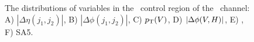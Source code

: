 \begin{figure}[htbp]
{    
  }
  \caption[Additional \qrkt\qrktbar\ Control Region Distributions for the \ZnnH\ Channel]{The distributions of variables in the \qrkt\qrktbar\ control region of the \ZnnH\ channel: A) $\left| \Delta \eta (j_{1}, j_{2}) \right|$, B) $\left| \Delta \phi (j_{1}, j_{2}) \right|$, C) $p_{\mathrm{T}}(V)$, D) $\left| \Delta \phi (V, H) \right|$, E) \pTmiss, F) SA5.}
  \label{fig:CR_Znn_TT_2}
\end{figure}

\clearpage


